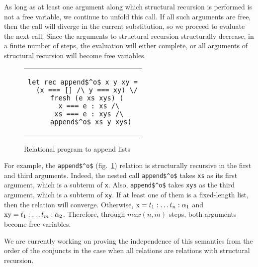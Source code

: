 As long as at least one argument along which structural recursion is performed is not a free variable, we continue to unfold this call. If all such arguments are free, then the call will diverge in the current substitution, so we proceed to evaluate the next call. Since the arguments to structural recursion structurally decrease, in a finite number of steps, the evaluation will either complete, or all arguments of structural recursion will become free variables.


\begin{figure}[h!]
\centering
\begin{tabular}{c}
\begin{lstlisting}
let rec append$^o$ x y xy =
  (x === [] /\ y === xy) \/
  fresh (e xs xys) (
    x === e : xs /\ 
    xs === e : xys /\ 
    append$^o$ xs y xys)
\end{lstlisting}
\end{tabular}


\caption{Relational program to append lists}
\label{fair:lst-appendo}
\end{figure}

For example, the \lstinline{append$^o$} (fig.~\ref{fair:lst-appendo}) relation is structurally recursive in the first and third arguments. Indeed, the nested call \lstinline{append$^o$} takes \lstinline{xs} as its first argument, which is a subterm of \lstinline{x}. Also, \lstinline{append$^o$} takes \lstinline{xys} as the third argument, which is a subterm of \lstinline{xy}. If at least one of them is a fixed-length list, then the relation will converge. Otherwise, $\mbox{\lstinline{x}} = t_1 : \ldots t_n : \alpha_1$ and $\mbox{\lstinline{xy}} = \bar{t}_1 : \ldots \bar{t}_m : \alpha_2$. Therefore, through $max(n, m)$ steps, both arguments become free variables.

We are currently working on proving the independence of this semantics from the order of the conjuncts in the case when all relations are relations with structural recursion.
